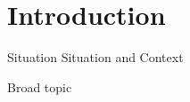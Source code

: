 \section{Introduction}
\begin{frame}{Situation}
	Situation and Context
	
	Broad topic
	
	
	
\end{frame}